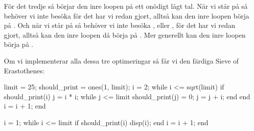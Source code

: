För det tredje så börjar den inre loopen på ett onödigt lågt tal. När vi står på  så behöver vi inte besöka  för det har vi redan gjort, alltså kan den inre loopen börja på . Och när vi står på  så behöver vi inte besöka ,  eller , för det har vi redan gjort, alltså kan den inre loopen då börja på . Mer generellt kan den inre loopen börja på .

Om vi implementerar alla dessa tre optimeringar så får vi den färdiga Sieve of Erastothenes:
\vspace{10pt}

\begin{matlab}
limit = 25;
should_print = ones(1, limit);
i = 2;
while i <= sqrt(limit) %
	if should_print(i) %
		j = i * i; %
		while j <= limit
			should_print(j) = 0;
			j = j + i;
		end
	end
	i = i + 1;
end

i = 1;
while i <= limit
	if should_print(i)
		disp(i);
	end
	i = i + 1;
end
\end{matlab}
